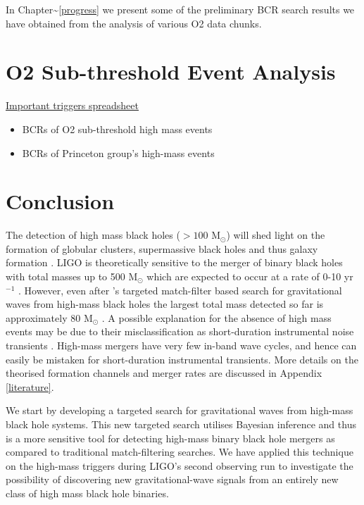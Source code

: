 \documentclass[%
 reprint,
 amsmath,amssymb,
 aps,
]{revtex4}
\begin{document}
In Chapter\textasciitilde\ref{progress} we present some of the preliminary BCR search results we
have obtained from the analysis of various O2 data chunks.




\section{\label{sec:Analysis}O2 Sub-threshold Event Analysis}
\hyperlink{https://docs.google.com/spreadsheets/d/1hm7lFsYneY8NGbFDr-vH5YYsILrxcTexO9D1AvF1qJo/edit?usp=sharing}{Important triggers spreadsheet}
\begin{itemize}
    \item BCRs of O2 sub-threshold high mass events
    \item BCRs of Princeton group's high-mass  events
\end{itemize}


\section{\label{sec:Conclusion}Conclusion}
The detection of high mass black holes (\(>100\) M\({}_\odot\)) will shed light on the formation of globular clusters,
supermassive black holes and thus galaxy formation \citep{lodato2006supermassive, 2018IMBHreview}. LIGO is theoretically
sensitive to the merger of binary black holes with total masses up to 500 M\({}_\odot\) which are expected to occur at a
rate of 0-10 yr\(^{-1}\) \citep[\citet{mandel2008rates}]{fregeau2006imbhbRatePrediction}. However, even after \citet{salemi2019search}'s
targeted match-filter based search for gravitational waves from high-mass black holes the largest total mass detected so
far is approximately 80 M\({}_\odot\) \citep{abbott2019gwtc}. A possible explanation for the absence of high mass events may be
due to their misclassification as short-duration instrumental noise transients \citep{blipGlitches}. High-mass mergers have
very few in-band wave cycles, and hence can easily be mistaken for short-duration instrumental transients. More details
on the theorised formation channels and merger rates are discussed in Appendix \ref{literature}.

We start by developing a targeted search for gravitational waves from high-mass black hole systems. This new targeted
search utilises Bayesian inference and thus is a more sensitive tool for detecting high-mass binary black hole mergers
as compared to traditional match-filtering searches. We have applied this technique on the high-mass triggers during
LIGO's second observing run to investigate the possibility of discovering new gravitational-wave signals from an
entirely new class of high mass black hole binaries.
\end{document}
